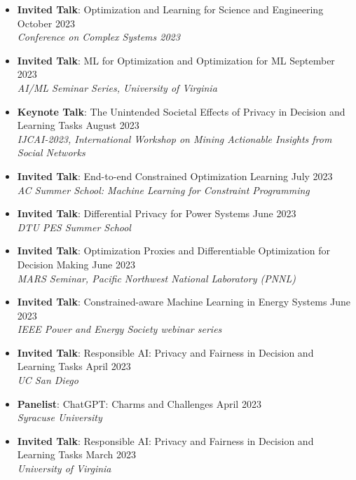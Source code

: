 \begin{itemize}
  \item {\bf Invited Talk}: {Optimization and Learning for Science and Engineering} \hfill{October 2023}\\
  {\em  Conference on Complex Systems 2023}

  \item {\bf Invited Talk}: {ML for Optimization and Optimization for ML} \hfill{September 2023}\\
  {\em  AI/ML Seminar Series, University of Virginia}

  \item {\bf Keynote Talk}: {The Unintended Societal Effects of Privacy in Decision and Learning Tasks} \hfill{August 2023}\\
  {\em  IJCAI-2023, International Workshop on Mining Actionable Insights from Social Networks}

  \item {\bf Invited Talk}: {End-to-end Constrained Optimization Learning} \hfill{July 2023}\\
  {\em  AC Summer School: Machine Learning for Constraint Programming}

  \item {\bf Invited Talk}: {Differential Privacy for Power Systems} \hfill{June 2023}\\
  {\em  DTU PES Summer School}

  \item {\bf Invited Talk}: {Optimization Proxies and Differentiable Optimization for Decision Making} \hfill{June 2023}\\
  {\em  MARS Seminar, Pacific Northwest National Laboratory (PNNL)}

  \item {\bf Invited Talk}: {Constrained-aware Machine Learning in Energy Systems} \hfill{June 2023}\\
  {\em  IEEE Power and Energy Society webinar series}

  \item {\bf Invited Talk}: {Responsible AI: Privacy and Fairness in Decision and Learning Tasks} \hfill{April 2023}\\
  {\em  UC San Diego}

  \item {\bf Panelist}: {ChatGPT: Charms and Challenges} \hfill{April 2023}\\
  {\em  Syracuse University}

  \item {\bf Invited Talk}: {Responsible AI: Privacy and Fairness in Decision and Learning Tasks} \hfill{March 2023}\\
  {\em  University of Virginia}


\end{itemize}
